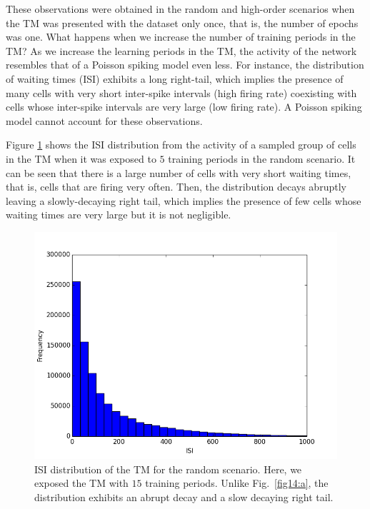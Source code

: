 \documentclass[11pt,letterpaper]{article}
\begin{document}
		    
		    These observations were obtained in the random and high-order scenarios when the TM
		    was presented with the dataset only once, that is, the number of epochs was one.
		    What happens when we increase the number of training periods in the TM?
		    As we increase the learning periods in the TM, the activity of the network resembles
		    that of a Poisson spiking model even less.
		    For instance, the distribution of waiting times (ISI) exhibits a long right-tail,
		    which implies the presence of many cells with very short inter-spike intervals (high firing rate)
		    coexisting with cells whose inter-spike intervals are very large (low firing rate).
		    A Poisson spiking model cannot account for these observations. 
		    
		    Figure \ref{fig16} shows the ISI distribution from the activity of a sampled group of
		    cells in the TM when it was exposed to $5$ training periods in the random scenario.
		    It can be seen that there is a large number of cells with very short waiting times, that
		    is, cells that are firing very often. Then, the distribution decays abruptly leaving
		    a slowly-decaying right tail, which implies the presence of few cells whose waiting times are very large
		    but it is not negligible.
		    
 		    \begin{figure}[t]
			    \centering
			    \includegraphics[scale=0.5]{EXP1_isiTM_epochsTM15.png}
			    \caption{
			        ISI distribution of the TM for the random scenario. 
			        Here, we exposed the TM with $15$ training periods.
			        Unlike Fig.~\ref{fig14:a}, the distribution exhibits an abrupt
			        decay and a slow decaying right tail.
			    }
			    \label{fig16}
		    \end{figure}	
		    
\end{document}
